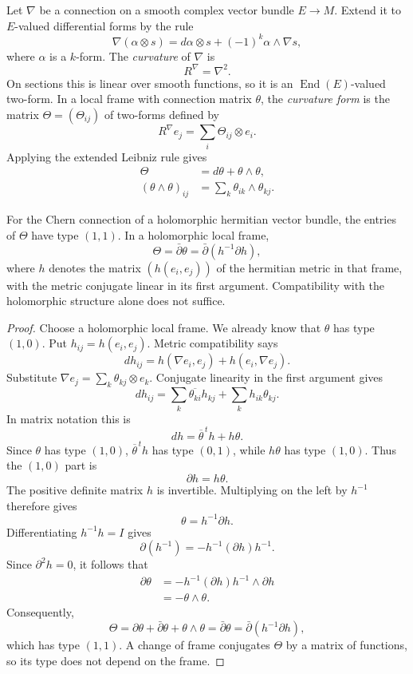 \begin{definition}
\label{definition-curvature-connection}
Let $\nabla$ be a connection on a smooth
complex vector bundle $E\to M$.
Extend it to $E$-valued differential
forms by the rule
$$
\nabla(\alpha\otimes s)
=d\alpha\otimes s
+(-1)^k\alpha\wedge\nabla s,
$$
where $\alpha$ is a $k$-form.
The {\it curvature} of $\nabla$ is
$$
R^\nabla=\nabla^2.
$$
On sections this is linear over smooth
functions, so it is an
$\operatorname{End}(E)$-valued two-form.
In a local frame with connection
matrix $\theta$, the
{\it curvature form} is the matrix
$\Theta=(\Theta_{ij})$ of two-forms
defined by
$$
R^\nabla e_j=\sum_i\Theta_{ij}\otimes e_i.
$$
Applying the extended Leibniz rule gives
$$
\begin{aligned}
\Theta&=d\theta+\theta\wedge\theta,\\
(\theta\wedge\theta)_{ij}
&=\sum_k\theta_{ik}\wedge\theta_{kj}.
\end{aligned}
$$
\end{definition}

\begin{lemma}
\label{lemma-chern-curvature-type}
For the Chern connection of a
holomorphic hermitian vector bundle,
the entries of $\Theta$ have type
$(1,1)$.
In a holomorphic local frame,
$$
\Theta=\bar\partial\theta
=\bar\partial(h^{-1}\partial h),
$$
where $h$ denotes the matrix
$(h(e_i,e_j))$ of the hermitian metric
in that frame, with the metric
conjugate linear in its first argument.
Compatibility with the holomorphic
structure alone does not suffice.
\end{lemma}

\begin{proof}
Choose a holomorphic local frame.
We already know that $\theta$ has type
$(1,0)$. Put $h_{ij}=h(e_i,e_j)$.
Metric compatibility says
$$
dh_{ij}
=h(\nabla e_i,e_j)+h(e_i,\nabla e_j).
$$
Substitute
$\nabla e_j=\sum_k\theta_{kj}\otimes e_k$.
Conjugate linearity in the first
argument gives
$$
dh_{ij}
=\sum_k\overline{\theta_{ki}}h_{kj}
+\sum_k h_{ik}\theta_{kj}.
$$
In matrix notation this is
$$
dh=\overline{\theta}^{\,t}h+h\theta.
$$
Since $\theta$ has type $(1,0)$,
$\overline{\theta}^{\,t}h$ has type
$(0,1)$, while $h\theta$ has type
$(1,0)$. Thus the $(1,0)$ part is
$$
\partial h=h\theta.
$$
The positive definite matrix $h$ is
invertible. Multiplying on the left
by $h^{-1}$ therefore gives
$$
\theta=h^{-1}\partial h.
$$
Differentiating $h^{-1}h=I$ gives
$$
\partial(h^{-1})
=-h^{-1}(\partial h)h^{-1}.
$$
Since $\partial^2h=0$, it follows that
$$
\begin{aligned}
\partial\theta
&=-h^{-1}(\partial h)h^{-1}
  \wedge\partial h\\
&=-\theta\wedge\theta.
\end{aligned}
$$
Consequently,
$$
\Theta
=\partial\theta+\bar\partial\theta
+\theta\wedge\theta
=\bar\partial\theta
=\bar\partial(h^{-1}\partial h),
$$
which has type $(1,1)$.
A change of frame conjugates $\Theta$
by a matrix of functions, so its type
does not depend on the frame.
\end{proof}

